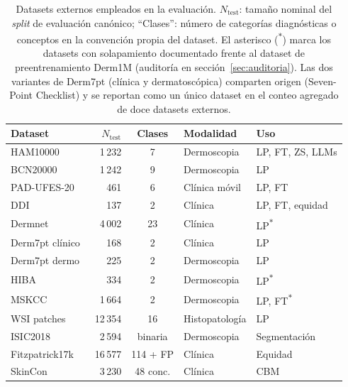 \begin{table}[H]
\centering
\footnotesize
\setlength{\tabcolsep}{4pt}
\renewcommand{\arraystretch}{0.95}
\caption{Datasets externos empleados en la evaluación.
$N_{\mathrm{test}}$: tamaño nominal del \emph{split} de evaluación
canónico; ``Clases'': número de categorías diagnósticas o conceptos
en la convención propia del dataset. El asterisco
(\textsuperscript{$\ast$}) marca los datasets con solapamiento
documentado frente al dataset de preentrenamiento Derm1M
(auditoría en sección~\ref{sec:auditoria}). Las dos variantes de Derm7pt
(clínica y dermatoscópica) comparten origen
(Seven-Point Checklist) y se reportan como un único dataset en el
conteo agregado de doce datasets externos.}
\label{tab:datasets-resumen}
\begin{tabular}{lrcll}
\hline
Dataset & $N_{\mathrm{test}}$ & Clases & Modalidad & Uso \\
\hline
HAM10000~\cite{ham10000}             & 1\,232  & 7        & Dermoscopia      & LP, FT, ZS, LLMs \\
BCN20000~\cite{bcn20000}             & 1\,242  & 9        & Dermoscopia      & LP \\
PAD-UFES-20~\cite{padufes}           & 461     & 6        & Clínica móvil    & LP, FT \\
DDI~\cite{ddi}                       & 137     & 2        & Clínica          & LP, FT, equidad \\
Dermnet~\cite{dermnet}               & 4\,002  & 23       & Clínica          & LP\textsuperscript{$\ast$} \\
Derm7pt clínico~\cite{kawahara2019}  & 168     & 2        & Clínica          & LP \\
Derm7pt dermo~\cite{kawahara2019}    & 225     & 2        & Dermoscopia      & LP \\
HIBA                                 & 334     & 2        & Dermoscopia      & LP\textsuperscript{$\ast$} \\
MSKCC                                & 1\,664  & 2        & Dermoscopia      & LP, FT\textsuperscript{$\ast$} \\
WSI patches                          & 12\,354 & 16       & Histopatología   & LP \\
ISIC2018~\cite{isic2018}             & 2\,594  & binaria  & Dermoscopia      & Segmentación \\
Fitzpatrick17k~\cite{fitzpatrick17k} & 16\,577 & 114 + FP & Clínica          & Equidad \\
SkinCon~\cite{skincon}               & 3\,230  & 48 conc. & Clínica          & CBM \\
\hline
\end{tabular}
\end{table}

